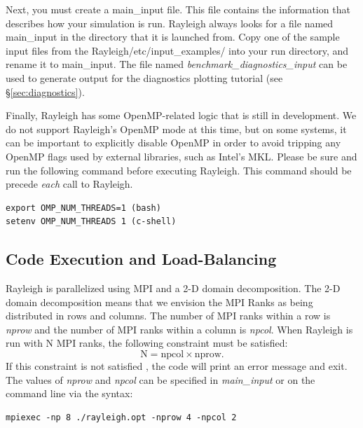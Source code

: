 Next, you must create a main\_input file.  This file contains the information that describes how your simulation is run.  Rayleigh always looks for a file named main\_input in the directory that it is launched from.  Copy one of the sample input files from the Rayleigh/etc/input\_examples/ into your run directory, and rename it to main\_input.  The file named \textit{benchmark\_diagnostics\_input} can be used to generate output for the diagnostics plotting tutorial (see \S \ref{sec:diagnostics}). 

Finally, Rayleigh has some OpenMP-related logic that is still in development.  We do not support Rayleigh's OpenMP mode at this time, but on some systems, it can be important to explicitly disable OpenMP in order to avoid tripping any OpenMP flags used by external libraries, such as Intel's MKL.  Please be sure and run the following command before executing Rayleigh.  This command should be precede \textit{each} call to Rayleigh. 
\begin{lstlisting}
export OMP_NUM_THREADS=1 (bash)
setenv OMP_NUM_THREADS 1 (c-shell)
\end{lstlisting}


\subsection{Code Execution and Load-Balancing}
Rayleigh is parallelized using MPI and a 2-D domain decomposition. The 2-D domain decomposition means that we envision the MPI Ranks as being distributed in rows and columns.  The number of MPI ranks within a row is \textit{nprow} and the number of MPI ranks within a column is \textit{npcol}.  When Rayleigh is run with N MPI ranks, the following constraint must be satisfied:
\begin{equation}
\mathrm{N} = \mathrm{npcol} \times \mathrm{nprow}   .
\end{equation}
If this constraint is not satisfied , the code will print an error message and exit.  The values of \textit{nprow} and \textit{npcol} can be specified in \textit{main\_input} or on the command line via the syntax:
\begin{lstlisting}
mpiexec -np 8 ./rayleigh.opt -nprow 4 -npcol 2
\end{lstlisting}

